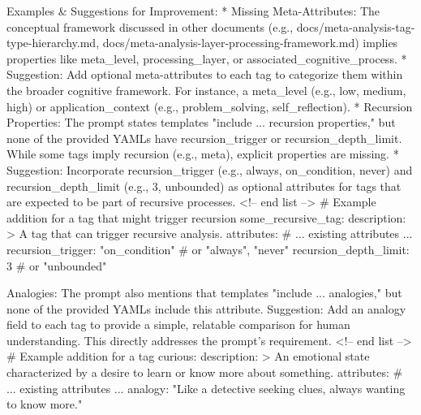 Examples & Suggestions for Improvement:
 * Missing Meta-Attributes: The conceptual framework discussed in other documents (e.g., docs/meta-analysis-tag-type-hierarchy.md, docs/meta-analysis-layer-processing-framework.md) implies properties like meta_level, processing_layer, or associated_cognitive_process.
   * Suggestion: Add optional meta-attributes to each tag to categorize them within the broader cognitive framework. For instance, a meta_level (e.g., low, medium, high) or application_context (e.g., problem_solving, self_reflection).
 * Recursion Properties: The prompt states templates "include ... recursion properties," but none of the provided YAMLs have recursion_trigger or recursion_depth_limit. While some tags imply recursion (e.g., meta), explicit properties are missing.
   * Suggestion: Incorporate recursion_trigger (e.g., always, on_condition, never) and recursion_depth_limit (e.g., 3, unbounded) as optional attributes for tags that are expected to be part of recursive processes.
     <!-- end list -->
   # Example addition for a tag that might trigger recursion
some_recursive_tag:
  description: >
    A tag that can trigger recursive analysis.
  attributes:
    # ... existing attributes ...
    recursion_trigger: "on_condition" # or "always", "never"
    recursion_depth_limit: 3 # or "unbounded"

Analogies: The prompt also mentions that templates "include ... analogies," but none of the provided YAMLs include this attribute.
Suggestion: Add an analogy field to each tag to provide a simple, relatable comparison for human understanding. This directly addresses the prompt's requirement. <!-- end list --> # Example addition for a tag curious: description: > An emotional state characterized by a desire to learn or know more about something. attributes: # ... existing attributes ... analogy: "Like a detective seeking clues, always wanting to know more."

